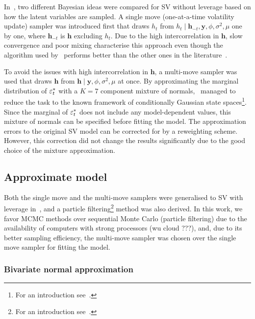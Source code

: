 In~\citet{Kim1998}, two different Bayesian ideas were compared for SV without leverage based on how the latent variables are sampled.
A single move (one-at-a-time volatility update) sampler was introduced first that draws $h_t$ from $h_t\mid\bm{h}_{-t},\bm{y},\phi,\sigma^2,\mu$ one by one, where $\bm{h}_{-t}$ is $\bm{h}$ excluding $h_t$.
Due to the high intercorrelation in $\bm{h}$, slow convergence and poor mixing characterise this approach even though the algorithm used by~\citeauthor{Kim1998} performs better than the other ones in the literature~\citep{shephard1993fitting,jacquier2002bayesian,shephard1994comment,shephard1997likelihood,geweke1994bayesian}.

To avoid the issues with high intercorrelation in $\bm{h}$, a multi-move sampler was used that draws $\bm{h}$ from $\bm{h}\mid\bm{y},\phi,\sigma^2,\mu$ at once.
By approximating the marginal distribution of $\varepsilon_t^\ast$ with a $K=7$ component mixture of normals,~\citeauthor{Kim1998} managed to reduce the task to the known framework of conditionally Gaussian state spaces\footnote{For an introduction see~\citet{Kitagawa1996}.}.
Since the marginal of $\varepsilon_t^\ast$ does not include any model-dependent values, this mixture of normals can be specified before fitting the model.
The approximation errors to the original SV model can be corrected for by a reweighting scheme.
However, this correction did not change the results significantly due to the good choice of the mixture approximation.


\subsection{Approximate model}

Both the single move and the multi-move samplers were generalised to SV with leverage in~\citet{Omori2007}, and a particle filtering\footnote{For an introduction see~\citet{Johannes2009}.} method was also derived.
In this work, we favor MCMC methods over sequential Monte Carlo (particle filtering) due to the availability of computers with strong processors (wu cloud ???), and, due to its better sampling efficiency, the multi-move sampler was chosen over the single move sampler for fitting the model.

\subsubsection{Bivariate normal approximation}

